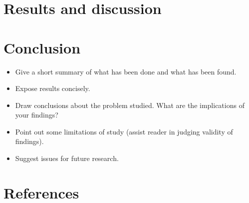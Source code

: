 \documentclass[a4paper,11pt]{article}
\begin{document}
\hypertarget{results-and-discussion}{%
\section{Results and discussion}\label{results-and-discussion}}

\hypertarget{conclusion}{%
\section{Conclusion}\label{conclusion}}
\begin{itemize}
\item
  Give a short summary of what has been done and what has been found.
\item
  Expose results concisely.
\item
  Draw conclusions about the problem studied. What are the implications of your
  findings?
\item
  Point out some limitations of study (assist reader in judging validity of
  findings).
\item
  Suggest issues for future research.
\end{itemize}
\newpage

\hypertarget{references}{%
\section*{References}\label{references}}

\noindent

\setlength{\parindent}{-0.5cm}
\setlength{\leftskip}{0.5cm}
\setlength{\parskip}{8pt}
\end{document}
